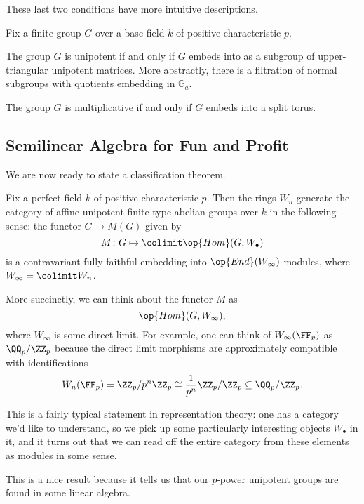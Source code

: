 \documentclass[../notes.tex]{subfiles}
\begin{document}
These last two conditions have more intuitive descriptions.
\begin{proposition}
	Fix a finite group $G$ over a base field $k$ of positive characteristic $p$.
	\begin{listalph}
		\item The group $G$ is unipotent if and only if $G$ embeds into as a subgroup of upper-triangular unipotent matrices. More abstractly, there is a filtration of normal subgroups with quotients embedding in $\mathbb G_a$.
		\item The group $G$ is multiplicative if and only if $G$ embeds into a split torus.
	\end{listalph}
\end{proposition}

\subsection{Semilinear Algebra for Fun and Profit}
We are now ready to state a classification theorem.
\begin{theorem} \label{thm:witt-for-finite-groups}
	Fix a perfect field $k$ of positive characteristic $p$. Then the rings $W_n$ generate the category of affine unipotent finite type abelian groups over $k$ in the following sense: the functor $G\to M(G)$ given by
	\[M\colon G\mapsto\colimit\op{Hom}(G,W_\bullet)\]
	is a contravariant fully faithful embedding into $\op{End}(W_\infty)$-modules, where $W_\infty=\colimit W_n$.
\end{theorem}
\begin{remark}
	More succinctly, we can think about the functor $M$ as
	\[\op{Hom}(G,W_\infty),\]
	where $W_\infty$ is some direct limit. For example, one can think of $W_\infty(\FF_p)$ as $\QQ_p/\ZZ_p$ because the direct limit morphisms are approximately compatible with identifications
	\[W_n(\FF_p)=\ZZ_p/p^n\ZZ_p\cong\frac1{p^n}\ZZ_p/\ZZ_p\subseteq\QQ_p/\ZZ_p.\]
\end{remark}
\begin{remark}
	This is a fairly typical statement in representation theory: one has a category we'd like to understand, so we pick up some particularly interesting objects $W_\bullet$ in it, and it turns out that we can read off the entire category from these elements as modules in some sense.
\end{remark}
This is a nice result because it tells us that our $p$-power unipotent groups are found in some linear algebra.
\end{document}
